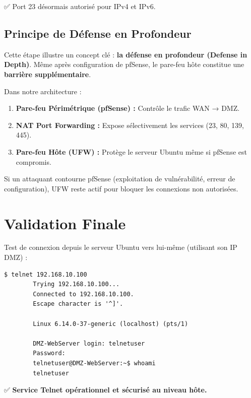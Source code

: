 \documentclass[12pt,a4paper,openany]{report}
\begin{document}
	✅ Port 23 désormais autorisé pour IPv4 et IPv6.
	
	\subsection{Principe de Défense en Profondeur}
	Cette étape illustre un concept clé : \textbf{la défense en profondeur (Defense in Depth)}. Même après configuration de pfSense, le pare-feu hôte constitue une \textbf{barrière supplémentaire}.
	
	\begin{tcolorbox}[colback=secondary!5!white, colframe=secondary, title=\textbf{Couches de Sécurité Multiples}]
		Dans notre architecture :
		\begin{enumerate}
			\item \textbf{Pare-feu Périmétrique (pfSense) :} Contrôle le trafic WAN → DMZ.
			\item \textbf{NAT Port Forwarding :} Expose sélectivement les services (23, 80, 139, 445).
			\item \textbf{Pare-feu Hôte (UFW) :} Protège le serveur Ubuntu même si pfSense est compromis.
		\end{enumerate}
		
		Si un attaquant contourne pfSense (exploitation de vulnérabilité, erreur de configuration), UFW reste actif pour bloquer les connexions non autorisées.
	\end{tcolorbox}
	
	\section{Validation Finale}
	Test de connexion depuis le serveur Ubuntu vers lui-même (utilisant son IP DMZ) :
	
	\begin{lstlisting}[caption=Test Telnet avec IP DMZ]
		$ telnet 192.168.10.100
		Trying 192.168.10.100...
		Connected to 192.168.10.100.
		Escape character is '^]'.
		
		Linux 6.14.0-37-generic (localhost) (pts/1)
		
		DMZ-WebServer login: telnetuser
		Password: 
		telnetuser@DMZ-WebServer:~$ whoami
		telnetuser
	\end{lstlisting}
	
	✅ \textbf{Service Telnet opérationnel et sécurisé au niveau hôte.}
	
\end{document}
